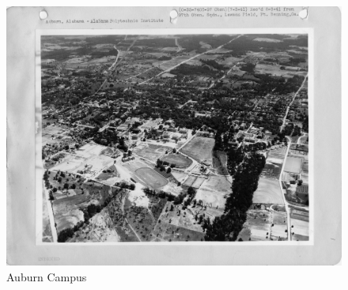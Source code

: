 \documentclass{article}   %
\begin{document}
  \begin{figure}[h!]
    \includegraphics[width=\linewidth]{auburn_01.jpg}
    \caption{Auburn Campus}
    \label{fig:au01}
  \end{figure}
\end{document}
